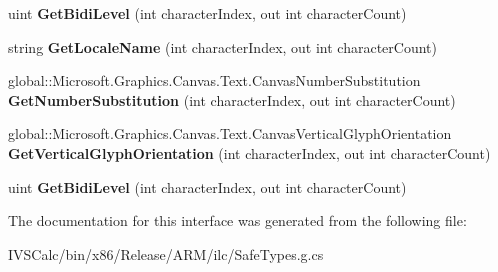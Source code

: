 \begin{DoxyCompactItemize}
uint {\bfseries Get\+Bidi\+Level} (int character\+Index, out int character\+Count)
\item 
\mbox{\label{interface_microsoft_1_1_graphics_1_1_canvas_1_1_text_1_1_i_canvas_text_analyzer_options_a918dda2a30e63c86197d6254b303dc11}} 
string {\bfseries Get\+Locale\+Name} (int character\+Index, out int character\+Count)
\item 
\mbox{\label{interface_microsoft_1_1_graphics_1_1_canvas_1_1_text_1_1_i_canvas_text_analyzer_options_a92599de3b68cec12b6272b3f8255df0f}} 
global\+::\+Microsoft.\+Graphics.\+Canvas.\+Text.\+Canvas\+Number\+Substitution {\bfseries Get\+Number\+Substitution} (int character\+Index, out int character\+Count)
\item 
\mbox{\label{interface_microsoft_1_1_graphics_1_1_canvas_1_1_text_1_1_i_canvas_text_analyzer_options_abaa5fe96fbf3026ac7b40c3751f31d02}} 
global\+::\+Microsoft.\+Graphics.\+Canvas.\+Text.\+Canvas\+Vertical\+Glyph\+Orientation {\bfseries Get\+Vertical\+Glyph\+Orientation} (int character\+Index, out int character\+Count)
\item 
\mbox{\label{interface_microsoft_1_1_graphics_1_1_canvas_1_1_text_1_1_i_canvas_text_analyzer_options_afd7cb7f1e71931b402fe4a142b98b27c}} 
uint {\bfseries Get\+Bidi\+Level} (int character\+Index, out int character\+Count)
\end{DoxyCompactItemize}


The documentation for this interface was generated from the following file\+:\begin{DoxyCompactItemize}
\item 
I\+V\+S\+Calc/bin/x86/\+Release/\+A\+R\+M/ilc/Safe\+Types.\+g.\+cs\end{DoxyCompactItemize}
